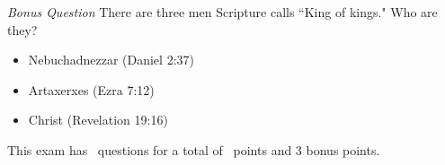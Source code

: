 \documentclass[11pt,addpoints]{exam}   	%
\begin{document}
\begin{questions}
\bonusquestion \emph{Bonus Question} There are three men Scripture calls ``King of kings." Who are they?
\begin{solution}
\begin{itemize}
\item Nebuchadnezzar (Daniel 2:37)
\item Artaxerxes (Ezra 7:12)
\item Christ (Revelation 19:16)
\end{itemize}
\end{solution}

\end{questions}

\begin{center}
This exam has \numquestions\ questions for a total of \numpoints\ points and 3 bonus points.
\end{center}

\pagebreak
\end{document}
